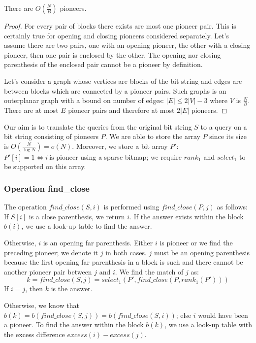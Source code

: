 \begin{lemma}
	There are $O(\frac{N}{B})$ pioneers.
\end{lemma}
\begin{proof}
	For every pair of blocks there exists are most one pioneer pair.
	This is certainly true for opening and closing pioneers considered separately.
	Let's assume there are two pairs, one with an opening pioneer, the other with a closing pioneer, then one pair is enclosed by the other.
	The opening nor closing parenthesis of the enclosed pair cannot be a pioneer by definition.
	
	Let's consider a graph whose vertices are blocks of the bit string and edges are between blocks which are connected by a pioneer pairs.
	Such graphs is an outerplanar graph with a bound on number of edges: $|E| \le 2 |V| - 3$ where $V$ is $\frac{N}{B}$.
	There are at most $E$ pioneer pairs and therefore at most $2 |E|$ pioneers.
\end{proof}

Our aim is to translate the queries from the original bit string $S$ to a query on a bit string consisting of pioneers $P$.
We are able to store the array $P$ since its size is $O(\frac{N}{\log N}) = o(N)$.
Moreover, we store a bit array $P'$: $P'[i] = 1 \iff i\ \textrm{is pioneer}$ using a sparse bitmap; we require $rank_1$ and $select_1$ to be supported on this array.

\subsubsection{Operation find\_close}

The operation $find\_close(S, i)$ is performed using $find\_close(P, j)$ as follows:
If $S[i]$ is a close parenthesis, we return $i$.
If the answer exists within the block $b(i)$, we use a look-up table to find the answer.

Otherwise, $i$ is an opening far parenthesis.
Either $i$ is pioneer or we find the preceding pioneer; we denote it $j$ in both cases.
$j$ must be an opening parenthesis because the first opening far parenthesis in a block is such and there cannot be another pioneer pair between $j$ and $i$.
We find the match of $j$ as:
$$ k = find\_close(S, j) = select_1(P', find\_close(P, rank_1(P'))) $$
If $i = j$, then $k$ is the answer.

Otherwise, we know that $b(k) = b(find\_close(S, j)) = b(find\_close(S, i))$; else $i$ would have been a pioneer.
To find the answer within the block $b(k)$, we use a look-up table with the excess difference $excess(i) - excess(j)$.


